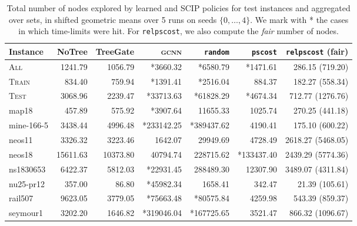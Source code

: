\documentclass[letterpaper]{article} %
\begin{document}
\begin{table*}[!t]
    \centering
    \begin{footnotesize}
        \begin{tabular}{lrrrrrr}
        \toprule
            Instance &    NoTree &  TreeGate &  \textsc{gcnn} &     \texttt{random} &     \texttt{pscost} &  \texttt{relpscost} (fair) \\
        \midrule
            \textsc{All} &    1241.79 &   1056.79 &  *3660.32 &    *6580.79 &    *1471.61 &     286.15 (719.20) \\
            \textsc{Train} &     834.40 &    759.94 &   *1391.41 &    *2516.04 &     884.37 &     182.27 (558.34) \\
            \textsc{Test} &    3068.96 &   2239.47 &  *33713.63 &   *61828.29 &    *4674.34 &     712.77 (1276.76) \\
        \midrule
              map18 &       457.89 &    575.92 &  *3907.64 &   11655.33 &    1025.74 &     270.25 (441.18) \\
         mine-166-5 &      3438.44 &   4996.48 &  *233142.25 &  *389437.62 &    4190.41 &     175.10 (600.22) \\
             neos11 &      3326.32 &   3223.46 &  1642.07 &   29949.69 &    4728.49 &    2618.27 (5468.05) \\
             neos18 &     15611.63 &  10373.80 &  40794.74 &  228715.62 &  *133437.40 &    2439.29 (5774.36) \\
          ns1830653 &      6422.37 &   5812.03 &  *22931.45 &  288489.30 &   12307.90 &    3489.07 (4311.84) \\
          nu25-pr12 &       357.00 &     86.80 &  *45982.34 &    1658.41 &     342.47 &      21.39 (105.61) \\
            rail507 &      9623.05 &   3779.05 &  *75663.48 &   *80575.84 &    4259.98 &     543.39 (859.37) \\
           seymour1 &      3202.20 &   1646.82 &  *319046.04 &  *167725.65 &    3521.47 &     866.32 (1096.67) \\
        \bottomrule
    \end{tabular}
\end{footnotesize}
\caption{Total number of nodes explored by learned and SCIP policies for test instances and aggregated over sets, in shifted geometric means over 5 runs on seeds $\{0, \dots, 4\}$. We mark with * the cases in which time-limits were hit. For \texttt{relpscost}, we also compute the \emph{fair} number of nodes.}
    \label{tab:nnodes_testeval}
\end{table*}
\end{document}
